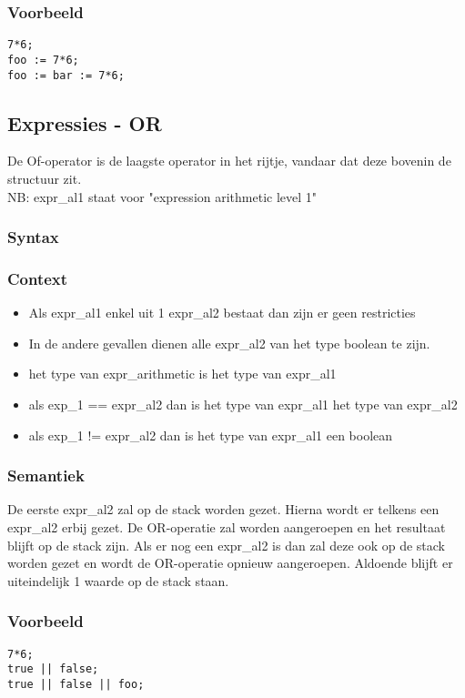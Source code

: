 \documentclass[]{article}
\begin{document}
\subsubsection{Voorbeeld}
\begin{lstlisting}[style=SELMA]
7*6;
foo := 7*6;
foo := bar := 7*6;
\end{lstlisting}

\subsection{Expressies - OR}
De Of-operator is de laagste operator in het rijtje, vandaar dat deze bovenin de structuur zit.
\\
NB: expr\_al1 staat voor "expression arithmetic level 1"
\subsubsection{Syntax}

\subsubsection{Context}
\begin{itemize}
\item Als expr\_al1 enkel uit 1 expr\_al2 bestaat dan zijn er geen restricties
\item In de andere gevallen dienen alle expr\_al2 van het type boolean te zijn.
\item het type van expr\_arithmetic is het type van expr\_al1
\item als exp\_1 == expr\_al2 dan is het type van expr\_al1 het type van expr\_al2
\item als exp\_1 != expr\_al2 dan is het type van expr\_al1 een boolean
\end{itemize}
\subsubsection{Semantiek}
De eerste expr\_al2 zal op de stack worden gezet. Hierna wordt er telkens een expr\_al2 erbij gezet. De OR-operatie zal worden aangeroepen en het resultaat blijft op de stack zijn. Als er nog een expr\_al2 is dan zal deze ook op de stack worden gezet en wordt de OR-operatie opnieuw aangeroepen. Aldoende blijft er uiteindelijk 1 waarde op de stack staan.
\subsubsection{Voorbeeld}
\begin{lstlisting}[style=SELMA]
7*6;
true || false;
true || false || foo;
\end{lstlisting}
\end{document}
